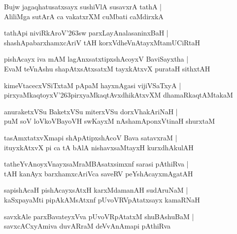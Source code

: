\documentclass[twoside,12pt,openright]{book}
\def\S{\char'263}
\newcounter{shloka}[chapter]
\begin{document}
\begin{shloka}
Bujw jagaqhatusatxsayx sushiVlA susavxrA tathA |\\
AliliMga sutArA ca vakatxrXM cuMbati caMdirxkA 
\end{shloka}

\begin{shloka}
tathApi niviRkAroV\S sw parxLayAnalasaninxBaH |\\
shashApabarxhamxcAriV tAH korxVdheVnAtayxMtamUCiRtaH 
\end{shloka}

\begin{shloka}
pishAcayx iva mAM lagAnxsatxtipxshAcoyxV BaviSayxtha |\\
EvaM teVnAshu shapAtxsAtxsatxM tayxkAtxvX purataH sithxtAH
\end{shloka}

\begin{shloka}
kimeVtacecxVSiTxtaM pApaM hayxnAgasi vijiVSaTxyA |\\
pirxyaMkaqtoyxV\S pirxyaMkaqtAvxdhikAtxvXM dhamaRkaqtAMtakaM 
\end{shloka}

\begin{shloka}
anuraketxVSu BaketxVSu miterxVSu dorxVhakAriNaH |\\
puM soV loVkoVBayoVH swKayxM nAshamAponxVtinaH shurxtaM 
\end{shloka}

\begin{shloka}
tasAmxtatxvXmapi shApAtipxshAcoV Bava satavxraM |\\
ituyxkAtxvX pi ca tA bAlA nishavxsaMtayxH kurxdhAkulAH 
\end{shloka}

\begin{shloka}
tatheYvAnoyxVnayxsaMraMBAsatxsimxnf sarasi pAthiRva |\\
tAH kanAyx barxhamxcAriVca saveRV peYshAcayxmAgatAH
\end{shloka}

\begin{shloka}
sapishAcaH pishAcayxsAtxH karxMdamanAH sudAruNaM |\\
kaSxpayaMti pipAkAMsAtxnf pUvoVRVpAtatxsayx kamaRNaH
\end{shloka}


\begin{shloka}
savxkAle parxBavateyxVva pUvoVRpAtatxM shuBAshuBaM |\\
savxcACxyAmiva duvARraM deVvAnAmapi pAthiRva
\end{shloka}
\end{document}
